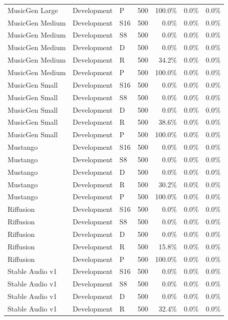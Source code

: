 \begin{longtable}{lllrrrr}
MusicGen Large & Development & P & 500 & 100.0\% & 0.0\% & 0.0\% \\
MusicGen Medium & Development & S16 & 500 & 0.0\% & 0.0\% & 0.0\% \\
MusicGen Medium & Development & S8 & 500 & 0.0\% & 0.0\% & 0.0\% \\
MusicGen Medium & Development & D & 500 & 0.0\% & 0.0\% & 0.0\% \\
MusicGen Medium & Development & R & 500 & 34.2\% & 0.0\% & 0.0\% \\
MusicGen Medium & Development & P & 500 & 100.0\% & 0.0\% & 0.0\% \\
MusicGen Small & Development & S16 & 500 & 0.0\% & 0.0\% & 0.0\% \\
MusicGen Small & Development & S8 & 500 & 0.0\% & 0.0\% & 0.0\% \\
MusicGen Small & Development & D & 500 & 0.0\% & 0.0\% & 0.0\% \\
MusicGen Small & Development & R & 500 & 38.6\% & 0.0\% & 0.0\% \\
MusicGen Small & Development & P & 500 & 100.0\% & 0.0\% & 0.0\% \\
Mustango & Development & S16 & 500 & 0.0\% & 0.0\% & 0.0\% \\
Mustango & Development & S8 & 500 & 0.0\% & 0.0\% & 0.0\% \\
Mustango & Development & D & 500 & 0.0\% & 0.0\% & 0.0\% \\
Mustango & Development & R & 500 & 30.2\% & 0.0\% & 0.0\% \\
Mustango & Development & P & 500 & 100.0\% & 0.0\% & 0.0\% \\
Riffusion & Development & S16 & 500 & 0.0\% & 0.0\% & 0.0\% \\
Riffusion & Development & S8 & 500 & 0.0\% & 0.0\% & 0.0\% \\
Riffusion & Development & D & 500 & 0.0\% & 0.0\% & 0.0\% \\
Riffusion & Development & R & 500 & 15.8\% & 0.0\% & 0.0\% \\
Riffusion & Development & P & 500 & 100.0\% & 0.0\% & 0.0\% \\
Stable Audio v1 & Development & S16 & 500 & 0.0\% & 0.0\% & 0.0\% \\
Stable Audio v1 & Development & S8 & 500 & 0.0\% & 0.0\% & 0.0\% \\
Stable Audio v1 & Development & D & 500 & 0.0\% & 0.0\% & 0.0\% \\
Stable Audio v1 & Development & R & 500 & 32.4\% & 0.0\% & 0.0\% \\

\end{longtable}
